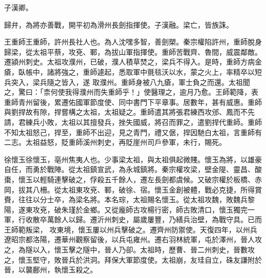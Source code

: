 \begin{pinyinscope}
 子漢卿。



 歸弁，為將亦善戰，開平初為滑州長劍指揮使。子漢融。梁亡，皆族誅。



 王重師王重師，許州長社人也。為人沈嘿多智，善劍槊。秦宗權陷許州，重師脫身歸梁，從太祖平蔡，攻兗、鄆，為拔山軍指揮使。重師苦戰齊、魯間，威震鄰敵。遷潁州刺史。太祖攻濮州，已破，濮人積草焚之，梁兵不得入。是時，重師方病金瘡，臥帳中，諸將強之，重師遽起，悉取軍中氈毯沃以水，蒙之火上，率精卒以短兵突入，梁兵隨之皆入，遂
 取濮州。重師身被八九瘡，軍士負之而還。太祖聞之，驚曰：「柰何使我得濮州而失重師乎！」使醫理之，逾月乃愈。王師範降，表重師青州留後，累遷佑國軍節度使、同中書門下平章事。居數年，甚有威惠。重師與劉捍故有隙，捍嘗構之太祖，太祖疑之。重師遣其將張君練西攻邠、鳳而不先請，君練兵小敗，太祖以其擅發兵，挫失國威，將召而罪之，遣劉捍代重師。重師不知太祖怒己，捍至，重師不出迎，見之青門，禮又倨，捍因馳白太祖，言重師有二志。太祖益怒，貶重師溪州刺史，再貶崖州司戶參軍，未行，賜死。



 徐懷玉徐懷玉，亳州焦夷人也。少事梁太祖，與太祖俱起微賤。懷玉為將，以雄豪自任，而勇於戰陣。從太祖鎮宣武，為永城鎮將。秦宗權攻梁，壁金隄、靈昌、酸棗，懷玉以輕騎連擊破之，俘殺五千餘人，遷左長劍都虞候。又破宗權於板橋、赤岡，拔其八柵。從太祖東攻兗、鄆，破徐、宿。懷玉金創被體，戰必克捷，所得賞賚，往往以分士卒，為梁名將。本名琮，太祖賜名懷玉。從太祖攻魏，敗魏兵黎陽，遂東攻兗，破朱瑾於金鄉。又從龐師古攻楊行密，師古敗清口，懷玉獨完一軍，行收散卒萬餘人以歸。遷沂州刺史，屬歲屢豐，乃繕兵治壁，為戰守具。已而王師範叛梁，
 攻東境，懷玉屢以州兵擊破之。遷齊州防禦使。天復四年，以州兵遼昭宗都洛陽，遷華州觀察留後，以兵屯雍州。遷右羽林統軍，屯於澤州，晉人攻之，為隧以入，懷玉擊之隧中，晉人乃卻。太祖時，歷曹、晉二州刺史，晉數攻之，懷玉堅守，敗晉兵於洪洞。拜保大軍節度使。太祖崩，友珪自立，硃友謙附於晉，以襲鄜州，執懷玉殺之。



\end{pinyinscope}